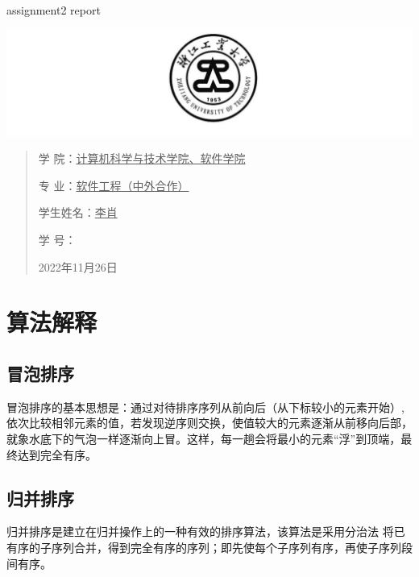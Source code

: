 \documentclass[UTF8]{ctexart}
\date{}
\begin{document}
\begin{center}
    \quad \\
    \quad \\
    \huge  assignment2 report
\end{center}
\vskip 3.5cm

\begin{center}
    \includegraphics[scale=0.6]{../img/logo.png}
\end{center}
\vskip 4.5cm

\begin{quotation}
    \songti \fontsize{15}{15}
    \doublespacing
    \par\setlength\parindent{6.5em}
    \quad

    学\hspace{0.61cm} 院：\underline{\quad 计算机科学与技术学院、软件学院}

    专\hspace{0.61cm} 业：\underline{\qquad 软件工程（中外合作）\qquad\qquad  }

    学生姓名：\underline{\qquad\qquad\qquad 李肖 \qquad\qquad\qquad\qquad }

    学\hspace{0.61cm} 号：\underline{\qquad{} \qquad\qquad\qquad}

    \vskip 1cm
    \centering
    2022年11月26日
\end{quotation}

\newpage

\section{算法解释}
\subsection{冒泡排序}
冒泡排序的基本思想是：通过对待排序序列从前向后（从下标较小的元素开始）,
依次比较相邻元素的值，若发现逆序则交换，使值较大的元素逐渐从前移向后部，
就象水底下的气泡一样逐渐向上冒。这样，每一趟会将最小的元素“浮”到顶端，最终达到完全有序。

\subsection{归并排序}
归并排序是建立在归并操作上的一种有效的排序算法，该算法是采用分治法
将已有序的子序列合并，得到完全有序的序列；即先使每个子序列有序，再使子序列段间有序。
\end{document}
